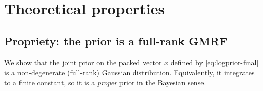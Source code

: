 \documentclass[11pt]{article}
\theoremstyle{definition}
\begin{document}
\section{Theoretical properties}

\subsection{Propriety: the prior is a full-rank GMRF}
\label{sec:propriety}

We show that the joint prior on the packed vector $x$ defined by
\eqref{eq:logprior-final} is a non-degenerate (full-rank) Gaussian
distribution. Equivalently, it integrates to a finite constant, so
it is a \emph{proper} prior in the Bayesian sense.
\end{document}
